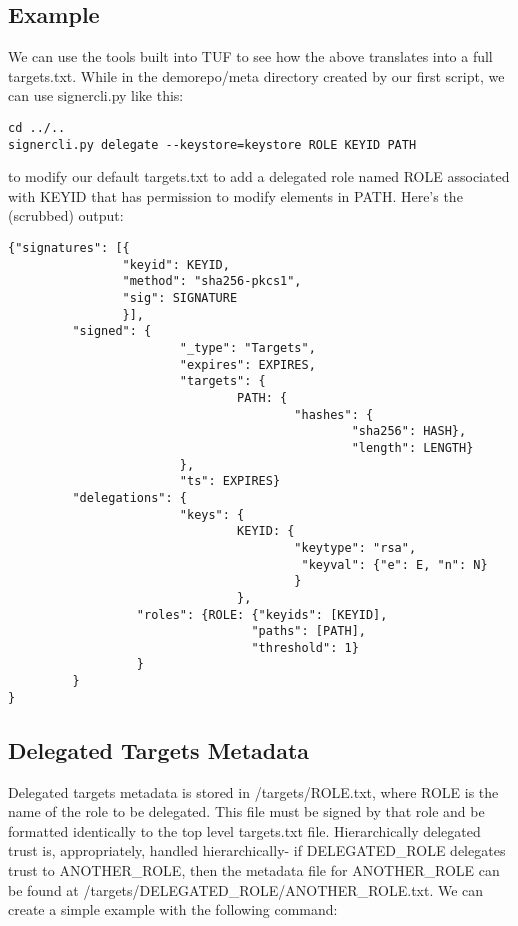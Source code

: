 \documentclass{letter}
\begin{document}
\subsection{Example}
We can use the tools built into TUF to see how the above translates into a full 
targets.txt. While in the demorepo/meta directory created by our first script, we can
use signercli.py like this:
\begin{lstlisting}
cd ../..
signercli.py delegate --keystore=keystore ROLE KEYID PATH
\end{lstlisting}
to modify our default targets.txt to add a delegated role named ROLE associated
with KEYID that has permission to modify elements in PATH. Here's the (scrubbed)
output:

\begin{verbatim}
{"signatures": [{
                "keyid": KEYID, 
                "method": "sha256-pkcs1", 
                "sig": SIGNATURE
                }], 
         "signed": {
                        "_type": "Targets", 
                        "expires": EXPIRES, 
                        "targets": {
                                PATH: {
                                        "hashes": {
                                                "sha256": HASH}, 
                                                "length": LENGTH}
                        }, 
                        "ts": EXPIRES}
         "delegations": {
                        "keys": {
                                KEYID: {
                                        "keytype": "rsa",
                                         "keyval": {"e": E, "n": N}
                                        }
                                }, 
                  "roles": {ROLE: {"keyids": [KEYID], 
                                  "paths": [PATH], 
                                  "threshold": 1}
                  }
         }
}
\end{verbatim}

\subsection{Delegated Targets Metadata}
Delegated targets metadata is stored in /targets/ROLE.txt, where ROLE is the
name of the role to be delegated. This file must be signed by that role and
be formatted identically to the top level targets.txt file. Hierarchically
delegated trust is, appropriately, handled hierarchically- if DELEGATED\_ROLE
delegates trust to ANOTHER\_ROLE, then the metadata file for ANOTHER\_ROLE can be
found at /targets/DELEGATED\_ROLE/ANOTHER\_ROLE.txt. We can create a simple
example with the following command:
\end{document}
